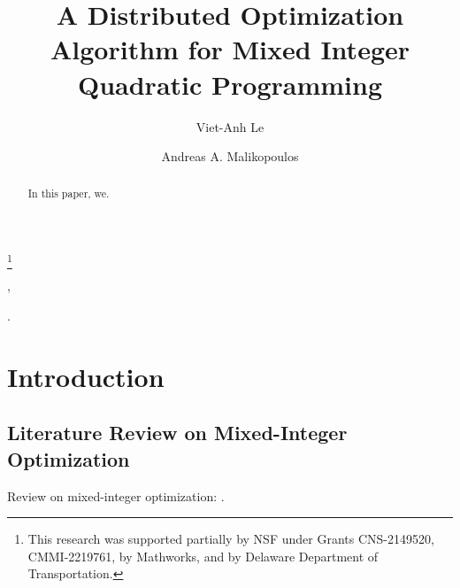 \documentclass[twocolumn,amsthm]{autart}%
\theoremstyle{definition}
\theoremstyle{plain}
\begin{document}
\begin{frontmatter}
\title{A Distributed Optimization Algorithm for Mixed Integer Quadratic Programming} %
\thanks[footnoteinfo]{This research was supported partially by NSF under Grants CNS-2149520, CMMI-2219761, by Mathworks, and by Delaware Department of Transportation.}

\author[UD,SY]{Viet-Anh Le},
\author[CEE]{Andreas A. Malikopoulos}


\address[UD]{Department of Mechanical Engineering, University of Delaware, Newark, DE 19716 USA}
\address[SY]{Systems Engineering Field, Cornell University, Ithaca, NY 14850 USA}
\address[CEE]{School of Civil and Environmental Engineering, Cornell University, Ithaca, NY 14853 USA}

\begin{keyword}                           %
.
\end{keyword}                             %


\begin{abstract}

In this paper, we.

\end{abstract}

\end{frontmatter}


\section{Introduction}

\subsection{Literature Review on Mixed-Integer Optimization}

Review on mixed-integer optimization: \cite[Sec. 5.2]{ioan2021mixed}.
\end{document}
